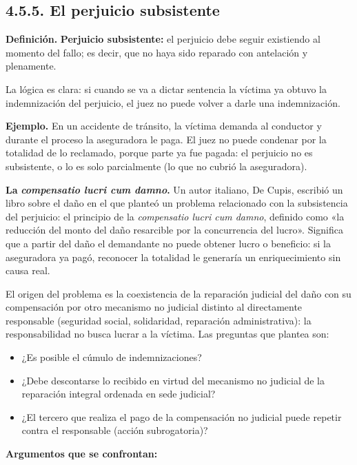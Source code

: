 \subsection{4.5.5. El perjuicio subsistente}
\begin{definicion}
\textcolor[HTML]{1F3864}{\textbf{Definición. }}\textbf{Perjuicio subsistente: }el perjuicio debe seguir existiendo al momento del fallo; es decir, que no haya sido reparado con antelación y plenamente.
\end{definicion}
La lógica es clara: si cuando se va a dictar sentencia la víctima ya obtuvo la indemnización del perjuicio, el juez no puede volver a darle una indemnización.

\begin{ejemplo}
\textcolor[HTML]{4F6228}{\textbf{Ejemplo. }}En un accidente de tránsito, la víctima demanda al conductor y durante el proceso la aseguradora le paga. El juez no puede condenar por la totalidad de lo reclamado, porque parte ya fue pagada: el perjuicio no es subsistente, o lo es solo parcialmente (lo que no cubrió la aseguradora).
\end{ejemplo}
\textbf{La }\textbf{\textit{compensatio lucri cum damno}}\textbf{.} Un autor italiano, De Cupis, escribió un libro sobre el daño en el que planteó un problema relacionado con la subsistencia del perjuicio: el principio de la \textit{compensatio lucri cum damno}, definido como «la reducción del monto del daño resarcible por la concurrencia del lucro». Significa que a partir del daño el demandante no puede obtener lucro o beneficio: si la aseguradora ya pagó, reconocer la totalidad le generaría un enriquecimiento sin causa real.

El origen del problema es la coexistencia de la reparación judicial del daño con su compensación por otro mecanismo no judicial distinto al directamente responsable (seguridad social, solidaridad, reparación administrativa): la responsabilidad no busca lucrar a la víctima. Las preguntas que plantea son:

\begin{itemize}
\item ¿Es posible el cúmulo de indemnizaciones?
\item ¿Debe descontarse lo recibido en virtud del mecanismo no judicial de la reparación integral ordenada en sede judicial?
\item ¿El tercero que realiza el pago de la compensación no judicial puede repetir contra el responsable (acción subrogatoria)?
\end{itemize}
\textbf{Argumentos que se confrontan:}

